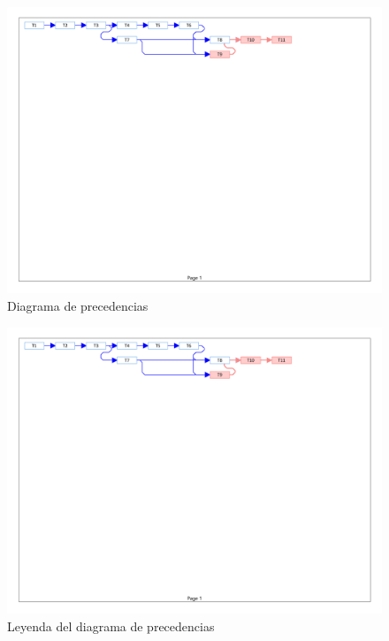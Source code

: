 \begin{figure}[!htbp]
	\centering
	\includegraphics[page=1, scale=.65]{fig/network_diagram_simplified}
	\caption{Diagrama de precedencias}\label{fig:network_diagram}
\end{figure}

\begin{figure}[!htbp]
    \centering
    \includegraphics[page=2, scale=.65]{fig/network_diagram_simplified}
    \caption{Leyenda del diagrama de precedencias}
\end{figure}